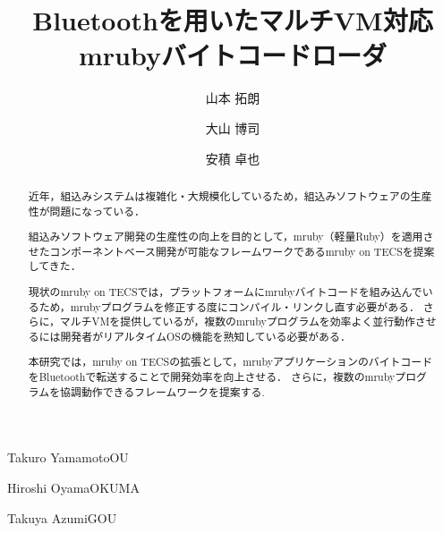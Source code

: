 \documentclass[submit]{ipsj_v2/UTF8/ipsj}
\begin{document}
\title{Bluetoothを用いたマルチVM対応\\mrubyバイトコードローダ}






\author{山本 拓朗}{Takuro Yamamoto}{OU}%
\author{大山 博司}{Hiroshi Oyama}{OKUMA}%
\author{安積 卓也}{Takuya Azumi}{GOU}%

\begin{abstract}
近年，組込みシステムは複雑化・大規模化しているため，組込みソフトウェアの生産性が問題になっている．

組込みソフトウェア開発の生産性の向上を目的として，mruby（軽量Ruby）を適用させたコンポーネントベース開発が可能なフレームワークであるmruby on TECSを提案してきた．

現状のmruby on TECSでは，プラットフォームにmrubyバイトコードを組み込んでいるため，mrubyプログラムを修正する度にコンパイル・リンクし直す必要がある．
さらに，マルチVMを提供しているが，複数のmrubyプログラムを効率よく並行動作させるには開発者がリアルタイムOSの機能を熟知している必要がある．

本研究では，mruby on TECSの拡張として，mrubyアプリケーションのバイトコードをBluetoothで転送することで開発効率を向上させる．
さらに，複数のmrubyプログラムを協調動作できるフレームワークを提案する.

\end{abstract}


%
\end{document}
